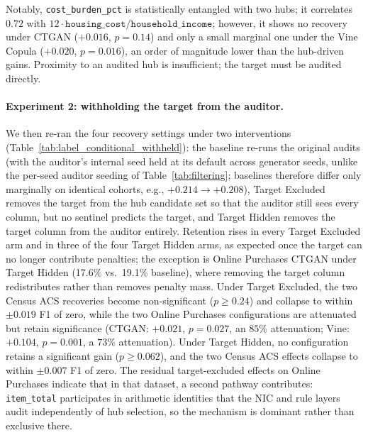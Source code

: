 \documentclass[pdflatex,sn-mathphys-num]{sn-jnl}
\theoremstyle{thmstyleone}%
\theoremstyle{thmstyletwo}%
\theoremstyle{thmstylethree}%
\begin{document}
Notably, \texttt{cost\_burden\_pct} is statistically entangled with two hubs; it correlates $0.72$ with $12 \cdot \texttt{housing\_cost} / \texttt{household\_income}$; however, it shows no recovery under CTGAN ($+0.016$, $p = 0.14$) and only a small marginal one under the Vine Copula ($+0.020$, $p = 0.016$), an order of magnitude lower than the hub-driven gains. Proximity to an audited hub is insufficient; the target must be audited directly.

\paragraph{Experiment 2: withholding the target from the auditor.} We then re-ran the four recovery settings under two interventions (Table~\ref{tab:label_conditional_withheld}): the baseline re-runs the original audits (with the auditor's internal seed held at its default across generator seeds, unlike the per-seed auditor seeding of Table~\ref{tab:filtering}; baselines therefore differ only marginally on identical cohorts, e.g., $+0.214 \to +0.208$), Target Excluded removes the target from the hub candidate set so that the auditor still sees every column, but no sentinel predicts the target, and Target Hidden removes the target column from the auditor entirely. Retention rises in every Target Excluded arm and in three of the four Target Hidden arms, as expected once the target can no longer contribute penalties; the exception is Online Purchases CTGAN under Target Hidden (17.6\% vs.\ 19.1\% baseline), where removing the target column redistributes rather than removes penalty mass. Under Target Excluded, the two Census ACS recoveries become non-significant ($p \ge 0.24$) and collapse to within $\pm 0.019$ F1 of zero, while the two Online Purchases configurations are attenuated but retain significance (CTGAN: $+0.021$, $p = 0.027$, an $85\%$ attenuation; Vine: $+0.104$, $p = 0.001$, a $73\%$ attenuation). Under Target Hidden, no configuration retains a significant gain ($p \ge 0.062$), and the two Census ACS effects collapse to within $\pm 0.007$ F1 of zero. The residual target-excluded effects on Online Purchases indicate that in that dataset, a second pathway contributes: \texttt{item\_total} participates in arithmetic identities that the NIC and rule layers audit independently of hub selection, so the mechanism is dominant rather than exclusive there.
\end{document}

